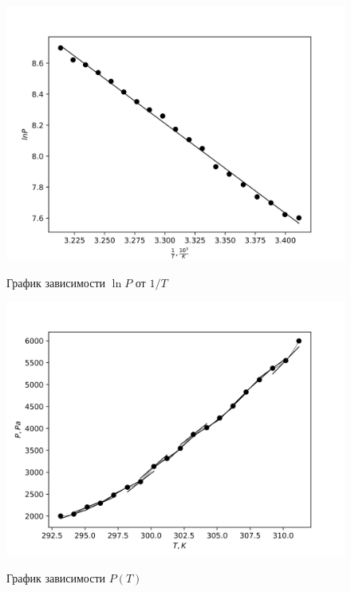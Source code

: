 \documentclass[14pt, a4paper]{report}
\begin{document}
\begin{figure}[!ht]
\centering
\includegraphics[scale=0.8]{terma2_1.png}
\label{image1}
\caption{График зависимости $\ln P$ от $1/T$}
\end{figure}

\begin{figure}[!ht]
\centering
\includegraphics[scale=0.8]{terma2_2.png}
\label{image2}
\caption{График зависимости $P(T)$}
\end{figure}
\end{document}
